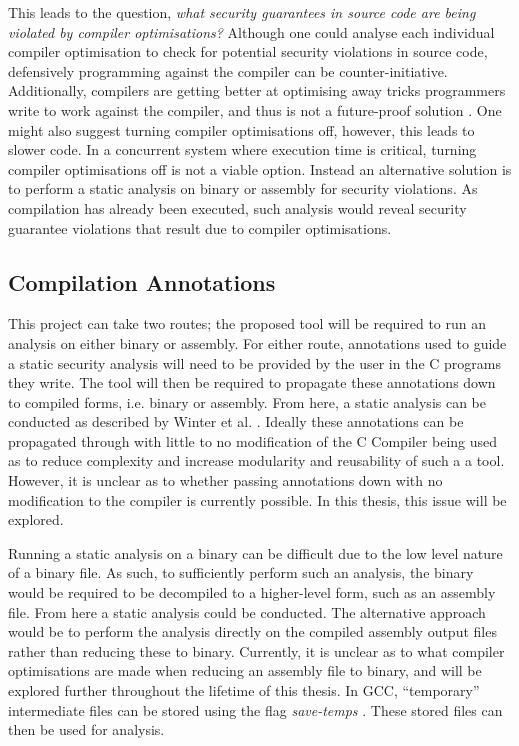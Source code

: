 \documentclass[twocolumn]{article}
\begin{document}
This leads to the question, \textit{what security guarantees in source code are being violated by compiler optimisations?} Although one could analyse each individual compiler optimisation to check for potential security violations in source code, defensively programming against the compiler can be counter-initiative. Additionally, compilers are getting better at optimising away tricks programmers write to work against the compiler, and thus is not a future-proof solution \cite{simon2018you}. One might also suggest turning compiler optimisations off, however, this leads to slower code. In a concurrent system where execution time is critical, turning compiler optimisations off is not a viable option. Instead an alternative solution is to perform a static analysis on binary or assembly for security violations. As compilation has already been executed, such analysis would reveal security guarantee violations that result due to compiler optimisations.

\subsection{Compilation Annotations}
This project can take two routes; the proposed tool will be required to run an analysis on either binary or assembly. For either route, annotations used to guide a static security analysis will need to be provided by the user in the C programs they write. The tool will then be required to propagate these annotations down to compiled forms, i.e. binary or assembly. From here, a static analysis can be conducted as described by Winter et al. \cite{winter2020information}. Ideally these annotations can be propagated through with little to no modification of the C Compiler being used as to reduce complexity and increase modularity and reusability of such a a tool. However, it is unclear as to whether passing annotations down with no modification to the compiler is currently possible. In this thesis, this issue will be explored.

Running a static analysis on a binary can be difficult due to the low level nature of a binary file. As such, to sufficiently perform such an analysis, the binary would be required to be decompiled to a higher-level form, such as an assembly file. From here a static analysis could be conducted. The alternative approach would be to perform the analysis directly on the compiled assembly output files rather than reducing these to binary. Currently, it is unclear as to what compiler optimisations are made when reducing an assembly file to binary, and will be explored further throughout the lifetime of this thesis. In GCC, ``temporary'' intermediate files can be stored using the flag \textit{save-temps} \cite{gccdevoptions}. These stored files can then be used for analysis.
\end{document}
